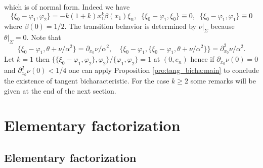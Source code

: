 \documentclass[12pt,leqno]{article} %
\def\dif{\partial}
\def\al{\alpha}
\def\be{\beta}
\numberwithin{equation}{section}
\begin{document}
%
which is of normal form. Indeed we have
%
\[
\{\xi_0-\varphi_1, \varphi_2\}=-k(1+k)x^k_1\be(x_1)\xi_n,\;\; \{\xi_0-\varphi_1,\xi_0\}\equiv 0,\;\; \{\xi_0-\varphi_1,\varphi_1\}\equiv 0
\]
%
where $\be(0)=1/2$. The transition behavior is determined by $\nu|_{\Sigma}$ because $\theta|_{\Sigma}=0$. Note that
%
%
%
%
%
\[
\{\xi_0-\varphi_1,\theta+\nu/\al^2\}=\dif_{x_0}\nu/\al^2,\quad \{\xi_0-\varphi_1,\{\xi_0-\varphi_1,\theta+\nu/\al^2\}\}=\dif_{x_0}^2\nu/\al^2.
\]
%
Let $k=1$ then  $\{\{\xi_0-\varphi_1,\varphi_2\},\varphi_2\}/\{\varphi_1,\varphi_2\}=1$ at $(0,e_n)$ hence if $\dif_{x_0}\nu(0)=0$ and $\dif_{x_0}^2\nu(0)<1/4$  one can apply Proposition \ref{pro:tang_bicha:main} to conclude the existence of tangent bicharacteristic. 
For the case $k\geq 2$ some remarks will be given at the end of the next section. 







\section{Elementary factorization}
\label{elfac}

\subsection{Elementary factorization}
\end{document}
